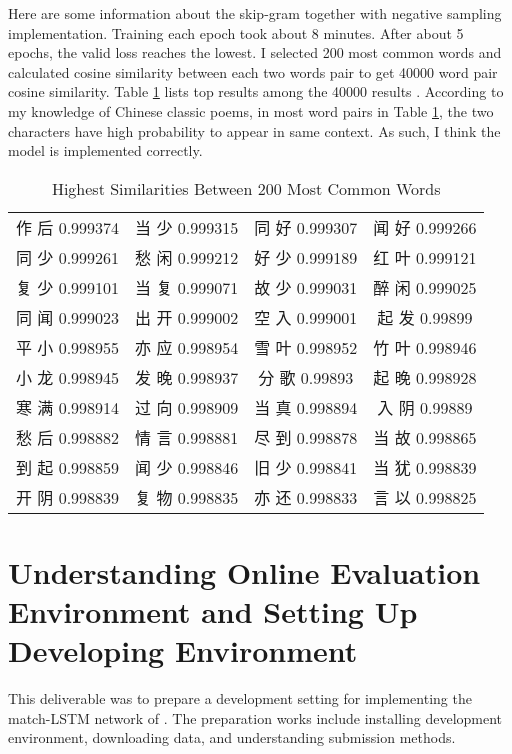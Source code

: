 \documentclass[12pt]{article}
\begin{document}
Here are some information about the skip-gram together with negative sampling implementation. Training each epoch took about 8 minutes. After about 5 epochs, the valid loss reaches the lowest. I selected 200 most common words and calculated cosine similarity between each two words pair to get 40000 word pair cosine similarity. Table \ref{table:similarity} lists top results among the 40000 results . According to my knowledge of Chinese classic poems, in most word pairs in Table \ref{table:similarity}, the two characters have high probability to appear in same context. As such, I think the model is implemented correctly.
\begin{CJK*}{UTF8}{gbsn}
\begin{table}[h!]
\centering
\begin{tabular}{c c c c }
作 后 0.999374 &
当 少 0.999315 &
同 好 0.999307 &
闻 好 0.999266 \\
同 少 0.999261 &
愁 闲 0.999212 &
好 少 0.999189 &
红 叶 0.999121 \\
复 少 0.999101 &
当 复 0.999071 &
故 少 0.999031 &
醉 闲 0.999025 \\
同 闻 0.999023 &
出 开 0.999002 &
空 入 0.999001 &
起 发 0.99899 \\
平 小 0.998955 &
亦 应 0.998954 &
雪 叶 0.998952 &
竹 叶 0.998946 \\
小 龙 0.998945 &
发 晚 0.998937 &
分 歌 0.99893 &
起 晚 0.998928 \\
寒 满 0.998914 &
过 向 0.998909 &
当 真 0.998894 &
入 阴 0.99889 \\
愁 后 0.998882 &
情 言 0.998881 &
尽 到 0.998878 &
当 故 0.998865 \\
到 起 0.998859 &
闻 少 0.998846 &
旧 少 0.998841 &
当 犹 0.998839 \\
开 阴 0.998839 &
复 物 0.998835 &
亦 还 0.998833 &
言 以 0.998825 \\

\end{tabular}
\caption{Highest Similarities Between 200 Most Common Words}
\label{table:similarity}
\end{table}
\end{CJK*}


\break

\section{Understanding Online Evaluation Environment and Setting Up Developing Environment}\label{sec:setup}

This deliverable was to prepare a development setting for implementing the match-LSTM network of \cite{wang2016machine}. The preparation works include installing development environment, downloading data, and understanding submission methods.
\end{document}
